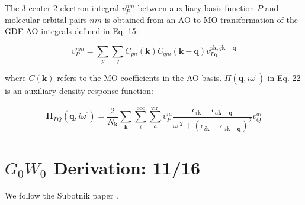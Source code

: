 \documentclass[12pt]{article}
\begin{document}
The 3-center 2-electron integral $v_{P}^{n m}$ between auxiliary basis function $P$ and molecular orbital pairs $n m$ is obtained from an AO to MO transformation of the GDF AO integrals defined in Eq. 15:

\begin{equation*}
v_{P}^{n m}=\sum_{p} \sum_{q} C_{p n}(\mathbf{k}) C_{q m}(\mathbf{k}-\mathbf{q}) v_{P \mathbf{q}}^{p \mathbf{k}, q \mathbf{k}-\mathbf{q}} 
\end{equation*}

where $C(\mathbf{k})$ refers to the MO coefficients in the AO basis. $\Pi\left(\mathbf{q}, i \omega^{\prime}\right)$ in Eq. 22 is an auxiliary density response function:

\begin{equation*}
\boldsymbol{\Pi}_{P Q}\left(\mathbf{q}, i \omega^{\prime}\right)=\frac{2}{N_{\mathbf{k}}} \sum_{\mathbf{k}} \sum_{i}^{\mathrm{occ}} \sum_{a}^{\text {vir }} v_{P}^{i a} \frac{\epsilon_{i \mathbf{k}}-\epsilon_{a \mathbf{k}-\mathbf{q}}}{\omega^{\prime 2}+\left(\epsilon_{i \mathbf{k}}-\epsilon_{a \mathbf{k}-\mathbf{q}}\right)^{2}} v_{Q}^{a i} 
\end{equation*}
\section{$G_0W_0$ Derivation: 11/16}
We follow the Subotnik paper \cite{Ou2016-ti}. 
\end{document}
